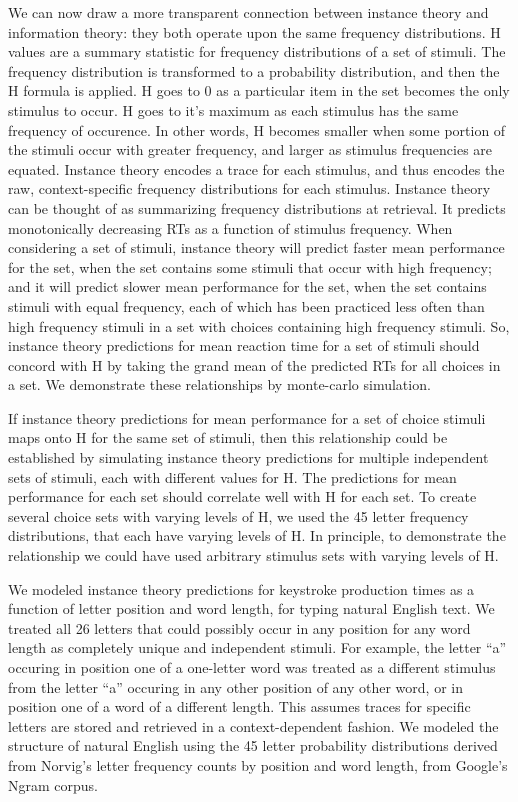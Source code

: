 \documentclass[floatsintext,man]{apa6}
\theoremstyle{definition}
\theoremstyle{definition}
\theoremstyle{definition}
\theoremstyle{remark}
\begin{document}
We can now draw a more transparent connection between instance theory
and information theory: they both operate upon the same frequency
distributions. H values are a summary statistic for frequency
distributions of a set of stimuli. The frequency distribution is
transformed to a probability distribution, and then the H formula is
applied. H goes to 0 as a particular item in the set becomes the only
stimulus to occur. H goes to it's maximum as each stimulus has the same
frequency of occurence. In other words, H becomes smaller when some
portion of the stimuli occur with greater frequency, and larger as
stimulus frequencies are equated. Instance theory encodes a trace for
each stimulus, and thus encodes the raw, context-specific frequency
distributions for each stimulus. Instance theory can be thought of as
summarizing frequency distributions at retrieval. It predicts
monotonically decreasing RTs as a function of stimulus frequency. When
considering a set of stimuli, instance theory will predict faster mean
performance for the set, when the set contains some stimuli that occur
with high frequency; and it will predict slower mean performance for the
set, when the set contains stimuli with equal frequency, each of which
has been practiced less often than high frequency stimuli in a set with
choices containing high frequency stimuli. So, instance theory
predictions for mean reaction time for a set of stimuli should concord
with H by taking the grand mean of the predicted RTs for all choices in
a set. We demonstrate these relationships by monte-carlo simulation.

If instance theory predictions for mean performance for a set of choice
stimuli maps onto H for the same set of stimuli, then this relationship
could be established by simulating instance theory predictions for
multiple independent sets of stimuli, each with different values for H.
The predictions for mean performance for each set should correlate well
with H for each set. To create several choice sets with varying levels
of H, we used the 45 letter frequency distributions, that each have
varying levels of H. In principle, to demonstrate the relationship we
could have used arbitrary stimulus sets with varying levels of H.

We modeled instance theory predictions for keystroke production times as
a function of letter position and word length, for typing natural
English text. We treated all 26 letters that could possibly occur in any
position for any word length as completely unique and independent
stimuli. For example, the letter \enquote{a} occuring in position one of
a one-letter word was treated as a different stimulus from the letter
\enquote{a} occuring in any other position of any other word, or in
position one of a word of a different length. This assumes traces for
specific letters are stored and retrieved in a context-dependent
fashion. We modeled the structure of natural English using the 45 letter
probability distributions derived from Norvig's letter frequency counts
by position and word length, from Google's Ngram corpus.
\end{document}
